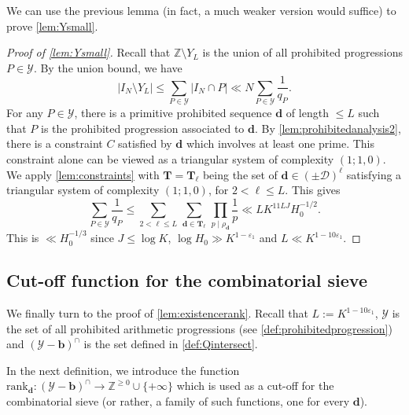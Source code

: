 \documentclass[11pt]{amsart}
\theoremstyle{definition}
\renewcommand{\leq}{\leqslant}
\renewcommand{\geq}{\geqslant}
\newcommand{\abs}[1]{\left|#1\right|}
\newcommand{\eps}{\varepsilon}
\newcommand{\Z}{\mathbb{Z}}
\newcommand{\rank}{\mathrm{rank}_{\d}}
\newcommand{\N}{I_N}
\newcommand{\D}{\mathcal{D}}
\renewcommand{\d}{\boldsymbol{d}}
\newcommand{\cstH}{\eps_1}
\newcommand{\boundelln}{\repK^{1-10\cstH}}
\newcommand{\sommespart}{b}
\newcommand{\fprod}[1]{\rho_{#1}}
\newcommand{\pall}{\fprod{\d}}
\newcommand{\ellp}{\ell}
\newcommand{\elln}{L}
\newcommand{\Y}{Y_{\!\elln}}
\renewcommand{\vec}{\boldsymbol}
\newcommand{\prohibprog}{\mathcal{Y}}
\newcommand{\modulus}{q}
\newcommand{\XX}{\mathbf{T}}
\newcommand{\repR}{J}
\newcommand{\repK}{K}
\newcommand{\shiftedprog}{\prohibprog-\vec{\sommespart}}
\newcommand{\interprog}{(\shiftedprog)^{\cap}}
\begin{document}
We can use the previous lemma (in fact, a much weaker version would suffice) to prove \cref{lem:Ysmall}.

\Ysmall*

\begin{proof}[Proof of \cref{lem:Ysmall}]
Recall that $\Z \setminus \Y$ is the union of all prohibited progressions $P\in \prohibprog$. By the union bound, we have
\begin{equation*}
	\abs{\N \setminus \Y} \leq \sum_{P\in \prohibprog} \abs{\N \cap P} \ll N \sum_{P\in \prohibprog} \frac{1}{\modulus_{P}}.
\end{equation*}
For any $P\in \prohibprog$, there is a primitive prohibited sequence $\d$ of length $\leq \elln$ such that $P$ is the prohibited progression associated to $\d$. By \cref{lem:prohibitedanalysis2}, there is a constraint $C$ satisfied by $\d$ which involves at least one prime. This constraint alone can be viewed as a triangular system of complexity $(1; 1, 0)$. We apply \cref{lem:constraints} with $\XX = \XX_{\ellp}$ being the set of ${\d}\in (\pm \D)^{\ellp}$ satisfying a triangular system of complexity $(1; 1, 0)$, for $2<\ellp\leq \elln$. This gives 
\begin{equation*}
	\sum_{P\in \prohibprog} \frac{1}{\modulus_{P}} \leq \sum_{2<\ellp\leq \elln}\, \sum_{\d\in \XX_{\ellp}}\, \prod_{p\mid \pall} \frac{1}{p} \ll \elln \repK^{11\elln \repR} H_0^{-1/2}.
\end{equation*}
This is $\ll H_0^{-1/3}$ since $\repR \leq \log \repK$, ${\log H_0 \gg\repK^{1-\cstH}}$ and $\elln \ll \boundelln$.
\end{proof}


\subsection{Cut-off function for the combinatorial sieve}
\label{sec:cutoffanalysis}
We finally turn to the proof of \cref{lem:existencerank}. Recall that $\elln := \boundelln$, $\prohibprog$ is the set of all prohibited arithmetic progressions (see \cref{def:prohibitedprogression}) and $\interprog$ is the set defined in \cref{def:Qintersect}. 

In the next definition, we introduce the function $\rank : \interprog \to \Z^{\geq 0} \cup \{+\infty\}$ which is used as a cut-off for the combinatorial sieve (or rather, a family of such functions, one for every $\d$). 
\end{document}
